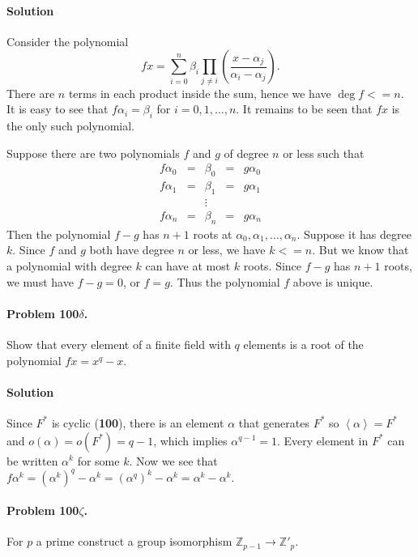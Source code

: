 \paragraph{Solution}
Consider the polynomial
$$
fx = \sum_{i=0}^n \beta_i \prod_{j \neq i}
	\left( \frac{x-\alpha_j}{\alpha_i-\alpha_j} \right).
$$
There are $n$ terms in each product inside the sum, hence we have
$\deg f <= n$. It is easy to see that $f\alpha_i = \beta_i$ for
$i = 0, 1, \dots, n$. It remains to be seen that $fx$ is the only such
polynomial.

Suppose there are two polynomials $f$ and $g$ of degree $n$ or less such that
$$
\begin{array}{ccccc}
f\alpha_0&=&\beta_0&=&g\alpha_0 \\
f\alpha_1&=&\beta_1&=&g\alpha_1 \\
& & \vdots & & \\
f\alpha_n&=&\beta_n&=&g\alpha_n
\end{array}
$$
Then the polynomial $f-g$ has $n+1$ roots at $\alpha_0, \alpha_1, \dots, \alpha_n$.
Suppose it has degree $k$. Since $f$ and $g$ both have degree $n$ or less, we
have $k <= n$. But we know that a polynomial with degree $k$ can have at most
$k$ roots. Since $f-g$ has $n+1$ roots, we must have $f-g=0$, or $f=g$. Thus
the polynomial $f$ above is unique.

\paragraph{Problem 100$\delta$.}
Show that every element of a finite field with $q$ elements is a root of the
polynomial $fx = x^q - x$.

\paragraph*{Solution}
Since $F^*$ is cyclic (\textbf{100}), there is an element $\alpha$ that generates
$F^*$ so $\left<\alpha\right> = F^*$ and $o(\alpha) = o(F^*) = q-1$, which implies
$\alpha^{q-1} = 1$. Every element in $F^*$ can be written $\alpha^k$ for some $k$.
Now we see that $f\alpha^k = (\alpha^k)^q - \alpha^k = (\alpha^q)^k - \alpha^k
= \alpha^k - \alpha^k$.

\paragraph{Problem 100$\zeta$.}
For $p$ a prime construct a group isomorphism $\mathbb{Z}_{p-1} \rightarrow \mathbb{Z}'_p$.

